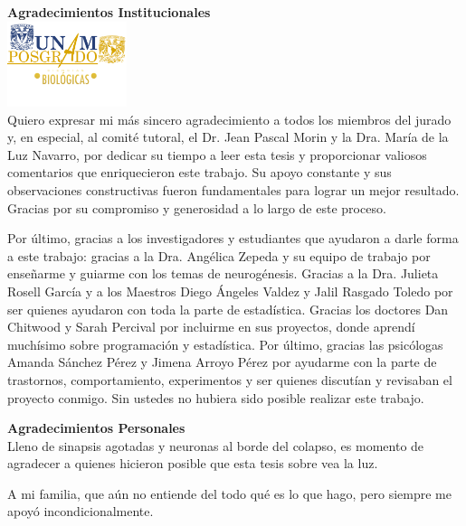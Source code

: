 \documentclass[
]{article}
\begin{document}
\newpage
    \begin{center}
        {\large \textbf{Agradecimientos Institucionales}}\\[0.3cm]
        \includegraphics[width=3.5cm]{ figuras/unamposgrado.png }\\[0.5cm]
        Quiero expresar mi más sincero agradecimiento a todos los miembros del jurado y, en especial, al comité tutoral, el Dr. Jean Pascal Morin y la Dra. María de la Luz Navarro, por dedicar su tiempo a leer esta tesis y proporcionar valiosos comentarios que enriquecieron este trabajo. Su apoyo constante y sus observaciones constructivas fueron fundamentales para lograr un mejor resultado. Gracias por su compromiso y generosidad a lo largo de este proceso.
        
        Por último, gracias a los investigadores y estudiantes que ayudaron a darle forma a este trabajo: gracias a la Dra. Angélica Zepeda y su equipo de trabajo por enseñarme y guiarme con los temas de neurogénesis. Gracias a la Dra. Julieta Rosell García y a los Maestros Diego Ángeles Valdez y Jalil Rasgado Toledo por ser quienes ayudaron con toda la parte de estadística. Gracias los doctores Dan Chitwood y Sarah Percival por incluirme en sus proyectos, donde aprendí muchísimo sobre programación y estadística. Por último, gracias las psicólogas Amanda Sánchez Pérez y Jimena Arroyo Pérez por ayudarme con la parte de trastornos, comportamiento, experimentos y ser quienes discutían y revisaban el proyecto conmigo. Sin ustedes no hubiera sido posible realizar este trabajo.
    \end{center}




\newpage
    \begin{center}
        {\large \textbf{Agradecimientos Personales}}\\[0.3cm]
        Lleno de sinapsis agotadas y neuronas al borde del colapso, es momento de agradecer a quienes hicieron posible que esta tesis sobre vea la luz.

        A mi familia, que aún no entiende del todo qué es lo que hago, pero siempre me apoyó incondicionalmente. 

    \end{center}
\end{document}
